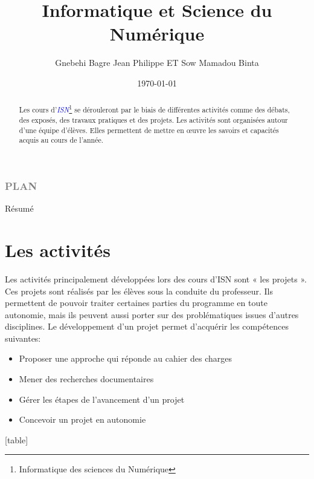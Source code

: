 \documentclass[a4paper, 12pt]{beamer}
\title{Informatique et Science du Numérique}
\date{\today}
\author{Gnebehi Bagre Jean Philippe ET Sow Mamadou Binta}
\begin{document}
	\begin{frame}
		\titlepage
	\end{frame}
\begin{frame}
\frametitle{\textbf{\textcolor{gray}{PLAN}}}
\tableofcontents
\end{frame}
	\begin{frame}
			   \begin{block}{Résumé}
			   		\begin{abstract}
			   Les cours d'\textcolor{blue}{\textit{ISN}}\footnote{Informatique des sciences du Numérique}  se dérouleront par le biais de différentes activités comme des débats, des exposés, des travaux pratiques et des projets. Les activités sont organisées autour d'une équipe d'élèves. Elles permettent de mettre en œuvre les savoirs et capacités acquis au cours de l'année.
			   	\end{abstract}
			   \end{block} 	
	
	\end{frame}
	\section{Les activités}	
	\begin{frame}
		\begin{block}{}
		Les activités principalement développées lors des cours d'ISN sont « les projets ». Ces projets sont réalisés par les élèves sous la conduite du professeur. Ils permettent de pouvoir traiter certaines parties du programme en toute autonomie, mais ils peuvent aussi porter sur des problématiques issues d'autres disciplines.
Le développement d'un projet permet d'acquérir les compétences suivantes:

      \begin{itemize}

\item Proposer une approche qui réponde au cahier des charges
\item Mener des recherches documentaires
\item Gérer les étapes de l'avancement d'un projet
\item Concevoir un projet en autonomie
 \end{itemize}	
		\end{block}	
	\end{frame}
	    
   [table]
      
\end{document}
